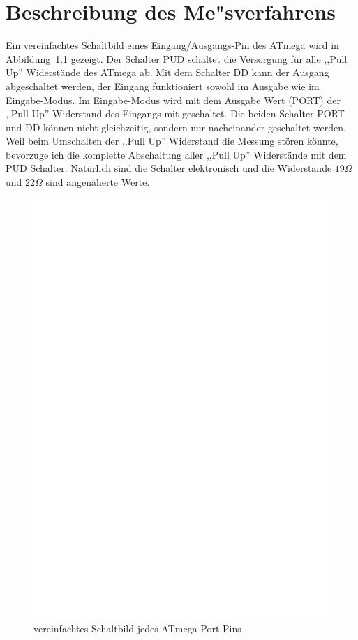 \chapter{Beschreibung des Me"sverfahrens}
Ein vereinfachtes Schaltbild eines Eingang/Ausgangs-Pin des ATmega wird in Abbildung~\ref{fig:port} gezeigt.
Der Schalter PUD schaltet die Versorgung f\"ur alle ,,Pull Up'' Widerst\"ande des ATmega ab.
Mit dem Schalter DD kann der Ausgang abgeschaltet werden, der Eingang funktioniert sowohl im Ausgabe wie im
Eingabe-Modus. Im Eingabe-Modus wird mit dem Ausgabe Wert (PORT) der ,,Pull Up'' Widerstand des Eingangs mit geschaltet.
Die beiden Schalter PORT und DD k\"onnen nicht gleichzeitig, sondern nur nacheinander geschaltet werden.
Weil beim Umschalten der ,,Pull Up'' Widerstand die Messung st\"oren k\"onnte, bevorzuge ich die komplette
Abschaltung aller ,,Pull Up'' Widerst\"ande mit dem PUD Schalter.
Nat\"urlich sind die Schalter elektronisch und die Widerst\"ande \(19\Omega\) und \(22\Omega\) sind angen\"aherte Werte.
\begin{figure}[h]
\centering
\includegraphics[]{../FIG/port.eps}
\caption{vereinfachtes Schaltbild jedes ATmega Port Pins}
\label{fig:port}
\end{figure}

